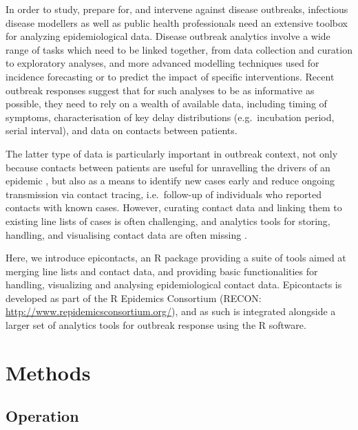 \documentclass[9pt,a4paper,]{extarticle}
\theoremstyle{definition}
\theoremstyle{definition}
\theoremstyle{definition}
\theoremstyle{remark}
\begin{document}
In order to study, prepare for, and intervene against disease outbreaks, infectious disease modellers as well as public health professionals need an extensive toolbox for analyzing epidemiological data. Disease outbreak analytics involve a wide range of tasks which need to be linked together, from data collection and curation to exploratory analyses, and more advanced modelling techniques used for incidence forecasting\citep{funk:2016}\citep{nouvellet:2017} or to predict the impact of specific interventions\citep{nouvellet:2015}\citep{parker:2015}. Recent outbreak responses suggest that for such analyses to be as informative as possible, they need to rely on a wealth of available data, including timing of symptoms, characterisation of key delay distributions (e.g.~incubation period, serial interval), and data on contacts between patients\citep{cauchemez:2014}\citep{aylward:2014}\citep{agua-agum:2015}\citep{cori:2017}.

The latter type of data is particularly important in outbreak context, not only because contacts between patients are useful for unravelling the drivers of an epidemic \citep{agua-agum:2016}\citep{cauchemez:2016}, but also as a means to identify new cases early and reduce ongoing transmission via contact tracing, i.e.~follow-up of individuals who reported contacts with known cases\citep{senga:2017}\citep{saurabh:2017}. However, curating contact data and linking them to existing line lists of cases is often challenging, and analytics tools for storing, handling, and visualising contact data are often missing \citep{who:2009}\citep{rakesh:2014}.

Here, we introduce epicontacts, an R package providing a suite of tools aimed at merging line lists and contact data, and providing basic functionalities for handling, visualizing and analysing epidemiological contact data. Epicontacts is developed as part of the R Epidemics Consortium (RECON: \url{http://www.repidemicsconsortium.org/}), and as such is integrated alongside a larger set of analytics tools for outbreak response using the R software\citep{rcore}.

\section{Methods}\label{methods}

\subsection{Operation}\label{operation}
\end{document}
